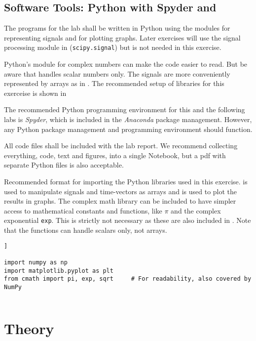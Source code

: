 \subsection{Software Tools: Python with Spyder and \jupyterlab}
The programs for the lab shall be written in Python using the modules \numpy for representing signals and \matplotlib for plotting graphs. Later exercises will use the signal processing module in \scipy (\texttt{scipy.signal}) but \scipy is not needed in this exercise.

Python's module for complex numbers \cmath can make the code easier to read. But be aware that \cmath handles scalar numbers only. The signals are more conveniently represented by arrays as in \numpy.
The recommended setup of libraries for this exerceise is shown in 

The recommended Python programming environment for this and the following labs is \emph{Spyder}\cite{raybaut_spyder_2024}, which is included in the \emph{Anaconda}\cite{noauthor_anaconda_2024} package management. However, any Python package management and programming environment should function.

All code files shall be included with the lab report. We recommend collecting everything, code, text and figures, into a single \jupyterlab Notebook\cite{project_jupyter_jupyter_nodate}, but a pdf with separate Python files is also acceptable.


\begin{table}[t!]
\caption{Recommended format for importing the Python libraries used in this exercise. \numpy is used to manipulate signals and time-vectors as arrays and \matplotlib is used to plot the results in graphs.
The complex math library \cmath can be included to have simpler access to mathematical constants and functions, like $\pi$ and the complex exponential \texttt{exp}. This is strictly not necessary as these are also included in \numpy. Note that the \cmath functions can handle scalars only, not arrays. }
\label{tab:import-libraries}
\begin{lstlisting}[style=pythonstyle]]
		
import numpy as np
import matplotlib.pyplot as plt
from cmath import pi, exp, sqrt     # For readability, also covered by NumPy
		
\end{lstlisting}
\end{table}


\section{Theory}

